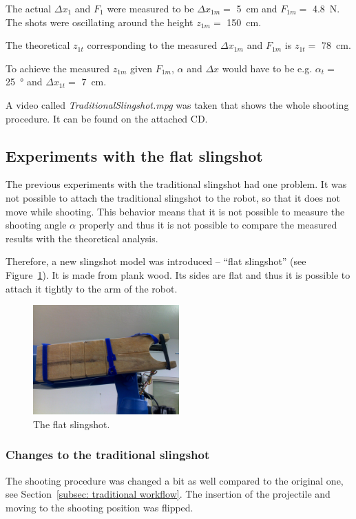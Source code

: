 			The actual $ \Delta x_1$ and $F_1$  were measured to be $\Delta x_{1m} = $ \SI{5}{cm} and $F_{1m} = $ \SI{4.8}{N}. The shots were oscillating around the height $z_{1m} =$ \SI{150}{cm}.
			
			The theoretical $z_{1t}$ corresponding to the measured $\Delta x_{1m}$ and $F_{1m}$ is $z_{1t} = $ \SI{78}{cm}.
			
			To achieve the measured $z_{1m}$ given $F_{1m}$, $ \alpha$ and $\Delta x$ would have to be e.g. $\alpha_t = $ \SI{25}{\degree} and $\Delta x_{1t} = $ \SI{7}{cm}.
			
			A video called \textit{TraditionalSlingshot.mpg} was taken that shows the whole shooting procedure. It can be found on the attached CD.

	
	\subsection{Experiments with the flat slingshot}
		The previous experiments with the traditional slingshot had one problem. It was not possible to attach the traditional slingshot to the robot, so that it does not move while shooting. This behavior means that it is not possible to measure the shooting angle $\alpha$ properly and thus it is not possible to compare the measured results with the theoretical analysis.

		Therefore, a new slingshot model was introduced -- ``flat slingshot'' (see Figure~\ref{fig:flat slingshot}). It is made from plank wood. Its sides are flat and thus it is possible to attach it tightly to the arm of the robot.

		\begin{figure}
		\includegraphics[width=0.5\textwidth]{attached_flat_slingshot.png}			
		\centering
		\caption{The flat slingshot.}
		\label{fig:flat slingshot}
		\end{figure}

		\subsubsection{Changes to the traditional slingshot}
			The shooting procedure was changed a bit as well compared to the original one, see Section~\ref{subsec: traditional workflow}. The insertion of the projectile and moving to the shooting position was flipped.

